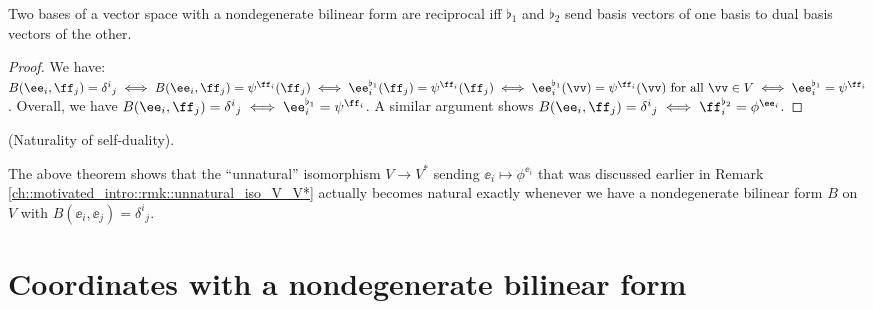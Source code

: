 \begin{theorem}
    Two bases of a vector space with a nondegenerate bilinear form are reciprocal iff $\flat_1$ and $\flat_2$ send basis vectors of one basis to dual basis vectors of the other.
\end{theorem}

\begin{proof}
    We have: $B(\ee_i, \ff_j) = \delta^i{}_j \iff B(\ee_i, \ff_j) = \psi^{\ff_i}(\ff_j) \iff \ee_i^{\flat_1}(\ff_j) = \psi^{\ff_i}(\ff_j) \iff \ee_i^{\flat_1}(\vv) = \psi^{\ff_i}(\vv) \text{ for all $\vv \in V$} \iff \ee_i^{\flat_1} = \psi^{\ff_i}$. Overall, we have $B(\ee_i, \ff_j) = \delta^i{}_j \iff \ee_i^{\flat_1} = \psi^{\ff_i}$. A similar argument shows $B(\ee_i, \ff_j) = \delta^i{}_j \iff \ff_i^{\flat_2} = \phi^{\ee_i}$.
\end{proof}

\begin{remark}
\label{ch::bilinear_forms_metric_tensors::thm::musical_iso_unique_self_dual_iso}
    (Naturality of self-duality).

    The above theorem shows that the ``unnatural'' isomorphism $V \rightarrow V^*$ sending $\ee_i \mapsto \phi^{\ee_i}$ that was discussed earlier in Remark \ref{ch::motivated_intro::rmk::unnatural_iso_V_V*} actually becomes natural exactly whenever we have a nondegenerate bilinear form $B$ on $V$ with $B(\ee_i, \ee_j) = \delta^i{}_j$.
\end{remark}

\newpage


\newpage

\section*{Coordinates with a nondegenerate bilinear form}

